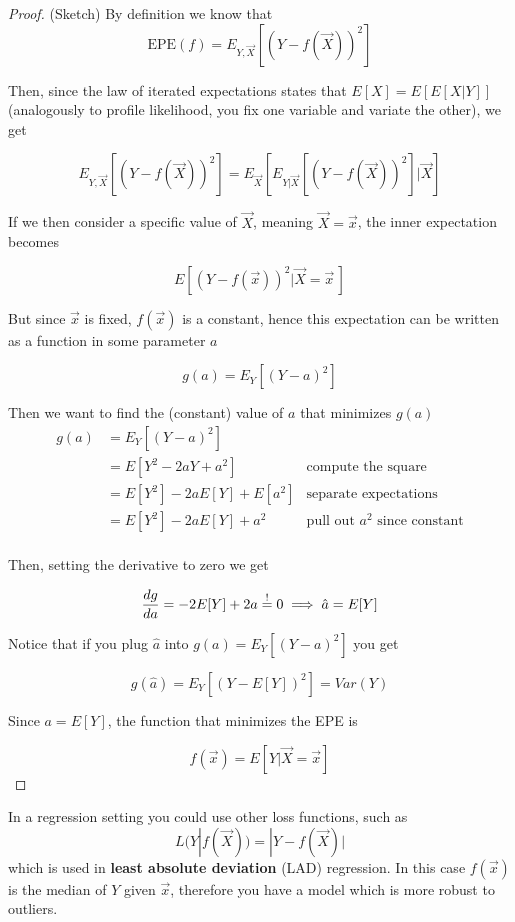     \begin{proof}
      (Sketch)
      By definition we know that
      $$\text{EPE}(f) = E_{Y,\vec{X}}[(Y-f(\vec{X}))^2]$$

      Then, since the law of iterated expectations states that $E[X] = E[E[X|Y]]$ (analogously to profile likelihood, you fix one variable and variate the other), we get 

      $$E_{Y,\vec{X}}[(Y-f(\vec{X}))^2] = E_{\vec{X}}[E_{Y|\vec{X}}[(Y-f(\vec{X}))^2]| \vec{X}]$$
      
      If we then consider a specific value of $\vec{X}$, meaning $\vec{X} = \vec{x}$, the inner expectation becomes 
      
      $$E[(Y-f(\vec{x}))^2 | \vec{X} = \vec{x}\,] $$
      
      But since $\vec{x}$ is fixed, $f(\vec{x})$ is a constant, hence this expectation can be written as a function in some parameter $a$

      $$g(a) = E_{Y}[(Y-a)^2]$$

      Then we want to find the (constant) value of $a$ that minimizes $g(a)$
      \begin{align*}
        g(a) & = E_{Y}[(Y-a)^2]               & \\
             & = E[Y^2 - 2aY + a^2]           & \text{compute the square} \\
             & = E[Y^2] -2aE[Y] + E[a^2]      & \text{separate expectations} \\
             & = E[Y^2] -2aE[Y] + a^2         & \text{pull out } a^2 \text{ since constant} \\
      \end{align*}

      Then, setting the derivative to zero we get 

      $$\frac{dg}{da} = -2E[Y] + 2a \overset{!}{=} 0 \implies \hat{a} = E[Y]$$

      Notice that if you plug $\hat{a}$ into $g(a) = E_{Y}[(Y-a)^2]$ you get

      $$g(\hat{a}) = E_{Y}[(Y-E[Y])^2] = Var(Y)$$
      
      Since $a = E[Y]$, the function that minimizes the EPE is 

      $$f(\vec{x}) = E[Y|\vec{X} = \vec{x}]$$
    \end{proof}

    In a regression setting you could use other loss functions, such as 
    $$L(Y|f(\vec{X})) = |Y - f(\vec{X})|$$
    which is used in \textbf{least absolute deviation} (LAD) regression. In this case $f(\vec{x})$ is the median of $Y$ given $\vec{x}$, therefore you have a model which is more robust to outliers.

